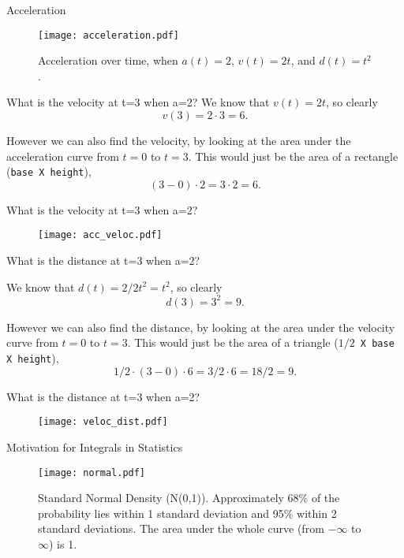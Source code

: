 \documentclass{beamer}
\begin{document}
\begin{frame}{Acceleration}
\begin{figure}[h!]\centering
    \texttt{[image: acceleration.pdf]}
    \caption{Acceleration over time, when $a(t)=2$, $v(t)=2t$, and $d(t)=t^2$.}
\end{figure}
\end{frame}





\begin{frame}{What is the velocity at t=3 when a=2?}
We know that $v(t)=2t$, so clearly $$v(3)=2\cdot 3=6.$$

However we can also find the velocity, by looking at the area under the acceleration curve from $t=0$ to $t=3$.  This would just be the area of a rectangle (\texttt{base X height}), $$(3-0)\cdot 2=3\cdot2=6.$$

\end{frame}

\begin{frame}{What is the velocity at t=3 when a=2?}

\begin{figure}[h!]\centering
    \texttt{[image: acc\_veloc.pdf]}
\end{figure}
\end{frame}


\begin{frame}{What is the distance at t=3 when a=2?}

We know that $ d(t)=2/2t^2=t^2$, so clearly  $$d(3)=3^2=9.$$  

However we can also find the distance, by looking at the area under the velocity curve from $t=0$ to $t=3$.  This would just be the area of a triangle ($1/2 $\texttt{ X base X height}), $$1/2\cdot (3-0)\cdot 6=3/2\cdot 6 =18/2=9.$$

\end{frame}


\begin{frame}{What is the distance at t=3 when a=2?}
\begin{figure}[h!]\centering
    \texttt{[image: veloc\_dist.pdf]}
\end{figure}
\end{frame}


\begin{frame}{Motivation for Integrals in Statistics}
\begin{figure}[h!]\centering
    \texttt{[image: normal.pdf]}
    \caption{Standard Normal Density (N(0,1)).  Approximately 68\% of the probability lies within 1 standard deviation and 95\% within 2 standard deviations. The area under the whole curve (from $-\infty$ to $\infty$) is 1.}
\end{figure}
\end{frame}
\end{document}
